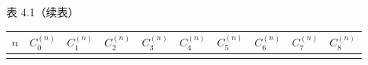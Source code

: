 \documentclass[
  10pt,
  fontset=fandol]{ctexart}
\newcounter{none} %
\begin{document}
表 4.1（续表）

{\def\LTcaptype{none} %
\begin{longtable}[]{@{}
  >{\raggedright\arraybackslash}p{}
  >{\raggedright\arraybackslash}p{}
  >{\raggedright\arraybackslash}p{}
  >{\raggedright\arraybackslash}p{}
  >{\raggedright\arraybackslash}p{}
  >{\raggedright\arraybackslash}p{}
  >{\raggedright\arraybackslash}p{}
  >{\raggedright\arraybackslash}p{}
  >{\raggedright\arraybackslash}p{}
  >{\raggedright\arraybackslash}p{}@{}}
\toprule\noalign{}
\begin{minipage}[b]{\linewidth}\raggedright
\(n\)
\end{minipage} & \begin{minipage}[b]{\linewidth}\raggedright
\(C_0^{(n)}\)
\end{minipage} & \begin{minipage}[b]{\linewidth}\raggedright
\(C_1^{(n)}\)
\end{minipage} & \begin{minipage}[b]{\linewidth}\raggedright
\(C_2^{(n)}\)
\end{minipage} & \begin{minipage}[b]{\linewidth}\raggedright
\(C_3^{(n)}\)
\end{minipage} & \begin{minipage}[b]{\linewidth}\raggedright
\(C_4^{(n)}\)
\end{minipage} & \begin{minipage}[b]{\linewidth}\raggedright
\(C_5^{(n)}\)
\end{minipage} & \begin{minipage}[b]{\linewidth}\raggedright
\(C_6^{(n)}\)
\end{minipage} & \begin{minipage}[b]{\linewidth}\raggedright
\(C_7^{(n)}\)
\end{minipage} & \begin{minipage}[b]{\linewidth}\raggedright
\(C_8^{(n)}\)
\end{minipage} \\
\midrule\noalign{}
\endhead
\bottomrule\noalign{}

\end{longtable}}
\end{document}
